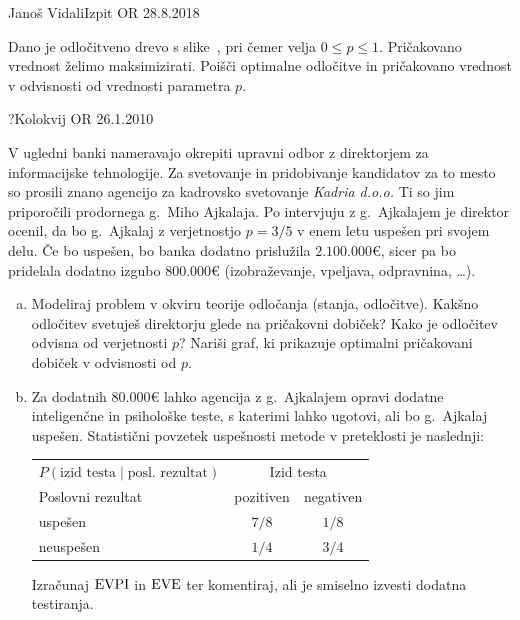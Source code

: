 \begin{naloga}{Janoš Vidali}{Izpit OR 28.8.2018}
\begin{vprasanje}[dectree3]
Dano je odločitveno drevo s slike~\fig{},
pri čemer velja $0 \le p \le 1$.
Pričakovano vrednost želimo maksimizirati.
Poišči optimalne odločitve in pričakovano vrednost
v odvisnosti od vrednosti parametra $p$.

\begin{slika}
\pgfslika
{}
\end{slika}
\end{vprasanje}
\begin{odgovor}
\end{odgovor}
\end{naloga}


\begin{naloga}{?}{Kolokvij OR 26.1.2010}
\begin{vprasanje}[ajkalaj]
V ugledni banki nameravajo okrepiti upravni odbor
z direktorjem za informacijske tehnologije.
Za svetovanje in pridobivanje kandidatov za to mesto
so prosili znano agencijo za kadrovsko svetovanje {\em Kadria d.o.o.}
Ti so jim priporočili prodornega g.~Miho Ajkalaja.
Po intervjuju z g.~Ajkalajem je direktor ocenil,
da bo g.~Ajkalaj z verjetnostjo $p = 3/5$ v enem letu uspešen pri svojem delu.
Če bo uspešen, bo banka dodatno prislužila $2.100.000 €$,
sicer pa bo pridelala dodatno izgubo $800.000 €$
(izobraževanje, vpeljava, odpravnina, \dots).

\begin{enumerate}[(a)]
\item Modeliraj problem v okviru teorije odločanja (stanja, odločitve).
Kakšno odločitev svetuješ direktorju glede na pričakovni dobiček?
Kako je odločitev odvisna od verjetnosti $p$?
Nariši graf, ki prikazuje optimalni pričakovani dobiček v odvisnosti od $p$.

\item Za dodatnih $80.000 €$ lahko agencija
z g.~Ajkalajem opravi dodatne inteligenčne in psihološke teste,
s katerimi lahko ugotovi, ali bo g.~Ajkalaj uspešen.
Statistični povzetek uspešnosti metode v preteklosti je naslednji:
\begin{center}
\begin{tabular}{l|cc}
$P(\text{izid testa} \;|\; \text{posl.~rezultat})$ &
\multicolumn{2}{c}{Izid testa} \\
Poslovni rezultat & pozitiven & negativen \\ \hline
uspešen   &  $7/8$ & $1/8$ \\
neuspešen &  $1/4$ & $3/4$
\end{tabular}
\end{center}
Izračunaj $\operatorname{EVPI}$ in $\operatorname{EVE}$ ter komentiraj,
ali je smiselno izvesti dodatna testiranja.


\end{enumerate}
\end{vprasanje}
\end{naloga}
